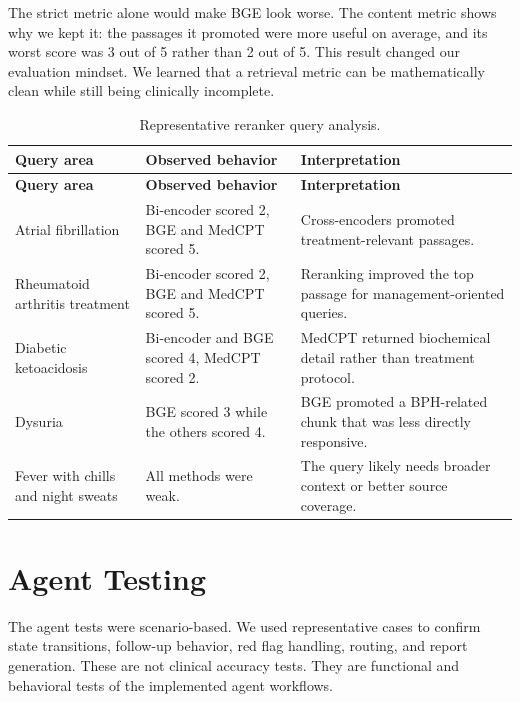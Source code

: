 The strict metric alone would make BGE look worse. The content metric shows why we kept it: the passages it promoted were more useful on average, and its worst score was 3 out of 5 rather than 2 out of 5. This result changed our evaluation mindset. We learned that a retrieval metric can be mathematically clean while still being clinically incomplete.

\begin{longtable}{p{} p{} p{}}
\caption{Representative reranker query analysis.}
\label{tab:reranker_query_analysis}\\
\toprule
\textbf{Query area} & \textbf{Observed behavior} & \textbf{Interpretation}\\
\midrule
\endfirsthead
\toprule
\textbf{Query area} & \textbf{Observed behavior} & \textbf{Interpretation}\\
\midrule
\endhead
Atrial fibrillation & Bi-encoder scored 2, BGE and MedCPT scored 5. & Cross-encoders promoted treatment-relevant passages.\\
Rheumatoid arthritis treatment & Bi-encoder scored 2, BGE and MedCPT scored 5. & Reranking improved the top passage for management-oriented queries.\\
Diabetic ketoacidosis & Bi-encoder and BGE scored 4, MedCPT scored 2. & MedCPT returned biochemical detail rather than treatment protocol.\\
Dysuria & BGE scored 3 while the others scored 4. & BGE promoted a BPH-related chunk that was less directly responsive.\\
Fever with chills and night sweats & All methods were weak. & The query likely needs broader context or better source coverage.\\
\bottomrule
\end{longtable}

\section{Agent Testing}

The agent tests were scenario-based. We used representative cases to confirm state transitions, follow-up behavior, red flag handling, routing, and report generation. These are not clinical accuracy tests. They are functional and behavioral tests of the implemented agent workflows.

